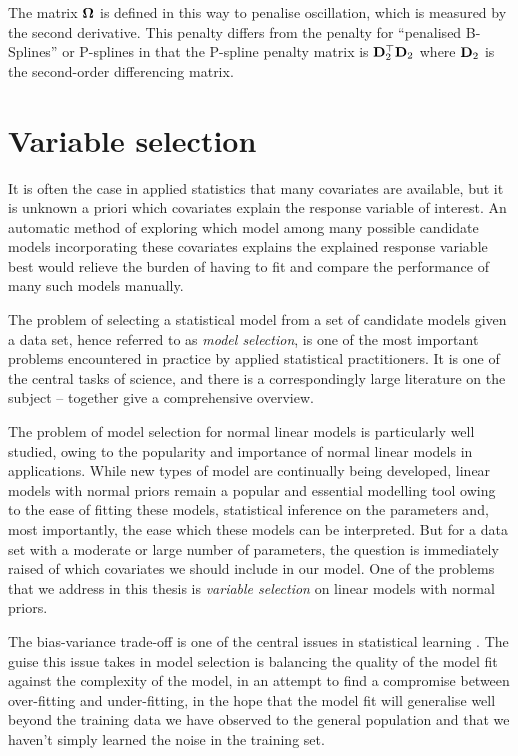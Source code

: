 The matrix ${\boldsymbol \Omega}$ is defined in this way to penalise oscillation, which is
measured by the second derivative. This penalty differs from the penalty for
``penalised B-Splines'' or P-splines in that the P-spline penalty matrix is
${\bf D}_2^\top {\bf D}_2$ where ${\bf D}_2$ is the second-order differencing matrix.

\section{Variable selection}

It is often the case in applied statistics that many covariates are available,
but it is unknown a priori which covariates explain the response variable of
interest. An automatic method of exploring which model among many possible
candidate models incorporating these covariates explains the explained response
variable best would relieve the burden of having to fit and compare the
performance of many such models manually.

The problem of selecting a statistical model from a set of candidate models
given a data set, hence referred to as \emph{model selection}, is one of the
most important problems encountered in practice by applied statistical
practitioners. It is one of the central tasks of science, and there is a
correspondingly large literature on the subject -- \cite{Claeskens:1251912,
NengjunYi2013, Johnstone2009} together give a comprehensive overview.

The problem of model selection for normal linear models is particularly well
studied, owing to the popularity and importance of normal linear models in
applications. While new types of model are continually being developed, linear
models with normal priors remain a popular and essential modelling tool owing to
the ease of fitting these models, statistical inference on the parameters and,
most importantly, the ease which these models can be interpreted. But for a data
set with a moderate or large number of parameters, the question is immediately
raised of which covariates we should include in our model. One of the problems
that we address in this thesis is \emph{variable selection} on linear models
with normal priors.

The bias-variance trade-off is one of the central issues in statistical learning
\citep{Murphy:2012:MLP:2380985, Bishop:2006:PRM:1162264,
hastie01statisticallearning}. The guise this issue takes in model selection is
balancing the quality of the model fit against the complexity of the model, in
an attempt to find a compromise between over-fitting and under-fitting, in the
hope that the model fit will generalise well beyond the training data we have
observed to the general population and that we haven't simply learned the noise
in the training set.

